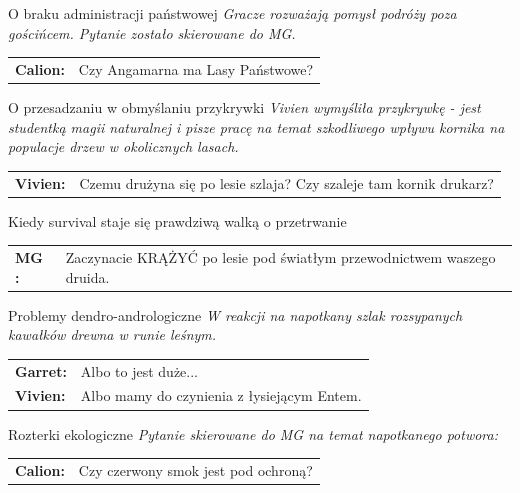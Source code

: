 \documentclass[10pt,twoside,twocolumn]{book}
\begin{document}
\begin{rpg-quotebox}{O braku administracji państwowej}
   \textit{Gracze rozważają pomysł podróży poza gościńcem. Pytanie zostało skierowane do MG.}\\

   \begin{tabularx}{\columnwidth}{lX}
      \textbf{Calion:} & Czy Angamarna ma Lasy Państwowe?\\
   \end{tabularx}
\end{rpg-quotebox}


\begin{rpg-quotebox}{O przesadzaniu w obmyślaniu przykrywki}
   \textit{Vivien wymyśliła przykrywkę - jest studentką magii naturalnej i pisze pracę na temat szkodliwego wpływu kornika na populacje drzew w okolicznych lasach. }\\

   \begin{tabularx}{\columnwidth}{lX}
      \textbf{Vivien:} & Czemu drużyna się po lesie szlaja? Czy szaleje tam kornik drukarz?\\
   \end{tabularx}
\end{rpg-quotebox}


\begin{rpg-quotebox}{Kiedy survival staje się prawdziwą walką o przetrwanie}
   \begin{tabularx}{\columnwidth}{lX}
      \textbf{MG :} & Zaczynacie KRĄŻYĆ po lesie pod światłym przewodnictwem waszego druida.\\
   \end{tabularx}
\end{rpg-quotebox}



\begin{rpg-quotebox}{Problemy dendro-andrologiczne}
   \textit{W reakcji na napotkany szlak rozsypanych kawałków drewna w runie leśnym.}\\

   \begin{tabularx}{\columnwidth}{lX}
      \textbf{Garret:} & Albo to jest duże...\\
      \textbf{Vivien:} & Albo mamy do czynienia z łysiejącym Entem.\\
   \end{tabularx}
\end{rpg-quotebox}


\begin{rpg-quotebox}{Rozterki ekologiczne}
   \textit{Pytanie skierowane do MG na temat napotkanego potwora:}

   \begin{tabularx}{\columnwidth}{lX}
      \textbf{Calion:} & Czy czerwony smok jest pod ochroną? \\
   \end{tabularx}
\end{rpg-quotebox}
\end{document}
